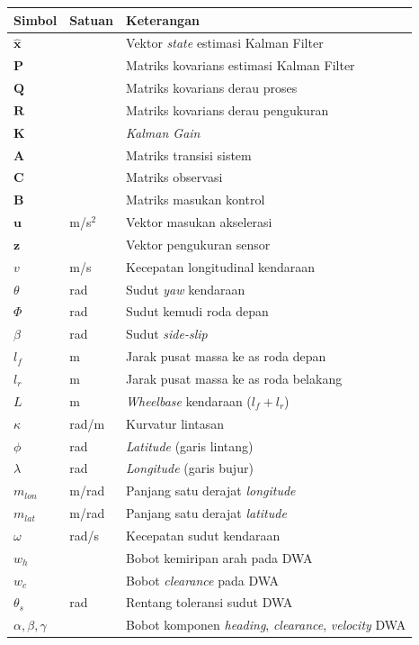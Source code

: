 \begin{longtable}{p{} p{} p{}}
\hline
\textbf{Simbol} & \textbf{Satuan} & \textbf{Keterangan} \\
\hline
\endhead
$\hat{\mathbf{x}}$ & & Vektor \emph{state} estimasi Kalman Filter \\
$\mathbf{P}$ & & Matriks kovarians estimasi Kalman Filter \\
$\mathbf{Q}$ & & Matriks kovarians derau proses \\
$\mathbf{R}$ & & Matriks kovarians derau pengukuran \\
$\mathbf{K}$ & & \emph{Kalman Gain} \\
$\mathbf{A}$ & & Matriks transisi sistem \\
$\mathbf{C}$ & & Matriks observasi \\
$\mathbf{B}$ & & Matriks masukan kontrol \\
$\mathbf{u}$ & m/s$^2$ & Vektor masukan akselerasi \\
$\mathbf{z}$ & & Vektor pengukuran sensor \\
$v$ & m/s & Kecepatan longitudinal kendaraan \\
$\theta$ & rad & Sudut \emph{yaw} kendaraan \\
$\Phi$ & rad & Sudut kemudi roda depan \\
$\beta$ & rad & Sudut \emph{side-slip} \\
$l_f$ & m & Jarak pusat massa ke as roda depan \\
$l_r$ & m & Jarak pusat massa ke as roda belakang \\
$L$ & m & \emph{Wheelbase} kendaraan ($l_f + l_r$) \\
$\kappa$ & rad/m & Kurvatur lintasan \\
$\phi$ & rad & \emph{Latitude} (garis lintang) \\
$\lambda$ & rad & \emph{Longitude} (garis bujur) \\
$m_{lon}$ & m/rad & Panjang satu derajat \emph{longitude} \\
$m_{lat}$ & m/rad & Panjang satu derajat \emph{latitude} \\
$\omega$ & rad/s & Kecepatan sudut kendaraan \\
$w_h$ & & Bobot kemiripan arah pada DWA \\
$w_c$ & & Bobot \emph{clearance} pada DWA \\
$\theta_s$ & rad & Rentang toleransi sudut DWA \\
$\alpha, \beta, \gamma$ & & Bobot komponen \emph{heading}, \emph{clearance}, \emph{velocity} DWA \\
\hline
\end{longtable}

